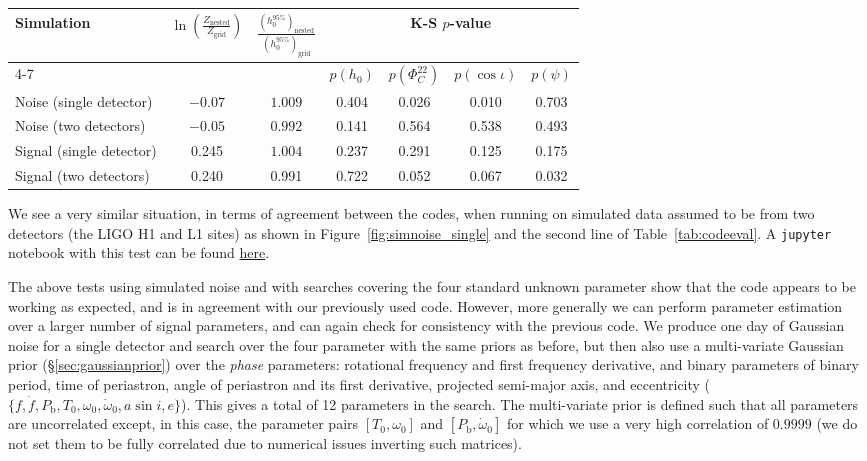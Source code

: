 \begin{table*}[hptb]
\caption{Consistency tests between outputs of the new code, \lppen, and the old code, \lppe, when running on simulated data
and searching over the four parameters $\{h_0, \cos{\iota}, \psi, \Phi_{22}^C\}$.\label{tab:codeeval}}
\begin{center}
\begin{tabular}{l c c | c c c c}
\hline
\multirow{2}{*}{Simulation} & \multirow{2}{*}{$\ln{\left(\frac{Z_{\text{nested}}}{Z_{\text{grid}}}\right)}$} & \multirow{2}{*}{$\frac{(h_0^{95\%})_{\text{nested}}}{(h_0^{95\%})_{\text{grid}}}$} & 
\multicolumn{4}{c}{K-S $p$-value} \\ \cline{4-7}
 &  &  & $p(h_0)$ & $p(\Phi_C^{22})$ & $p(\cos{\iota})$ & $p(\psi)$ \\                      
\hline
\hline
Noise (single detector)  & $-0.07$ & $1.009$ & 0.404 & 0.026 & 0.010 & 0.703 \\
Noise (two detectors)    & $-0.05$ & $0.992$ & 0.141 & 0.564 & 0.538 & 0.493 \\
Signal (single detector) & 0.245   & $1.004$ & 0.237 & 0.291 & 0.125 & 0.175 \\
Signal (two detectors)   & 0.240   & 0.991   & 0.722 & 0.052 & 0.067 & 0.032 \\
\hline
\end{tabular}
\end{center}
\end{table*}

We see a very similar situation, in terms of agreement between the codes, when running on simulated data assumed to be from two detectors (the LIGO
H1 and L1 sites) as shown in Figure~\ref{fig:simnoise_single} and the second line of Table~\ref{tab:codeeval}. A {\tt jupyter} notebook with this test
can be found \href{https://github.com/mattpitkin/CW_nested_sampling_doc/blob/master/figures/codeeval/simulations/noise_multidet/SimulatedNoiseTestsMultidetPaper.ipynb}{here}.

The above tests using simulated noise and with searches covering the four standard unknown \gw parameter show that the code appears to
be working as expected, and is in agreement with our previously used code. However, more generally we can perform parameter estimation
over a larger number of signal parameters, and can again check for consistency with the previous code. We produce one day of Gaussian
noise for a single detector and search over the four \gw parameter with the same priors as before, but then also use a multi-variate Gaussian prior (\S\ref{sec:gaussianprior})
over the {\it phase} parameters: rotational frequency and first frequency derivative, and binary parameters of binary period, time of periastron, angle of
periastron and its first derivative, projected semi-major axis, and eccentricity ($\{f,\dot{f},P_{\text{b}}, T_0, \omega_0, \dot{\omega}_0, a\sin{i}, e\}$).
This gives a total of 12 parameters in the search. The multi-variate prior is defined such that all parameters are uncorrelated except, in this case,
the parameter pairs $[T_0, \omega_0]$ and $[P_{\text{b}}, \dot{\omega}_0]$ for which we use a very high correlation of $0.9999$ (we do not set them to
be fully correlated due to numerical issues inverting such matrices).

